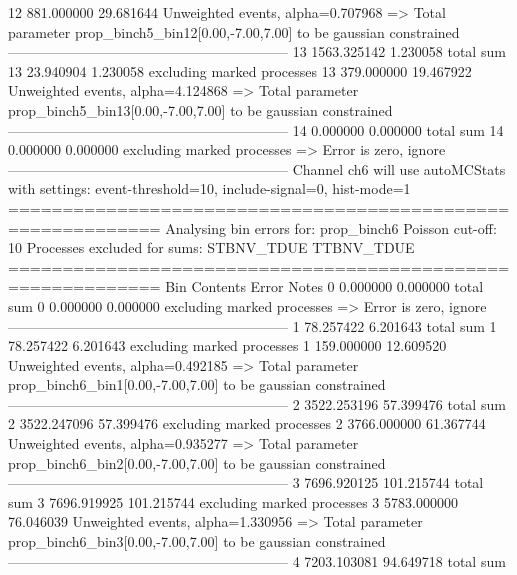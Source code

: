 12         881.000000      29.681644       Unweighted events, alpha=0.707968
  => Total parameter prop_binch5_bin12[0.00,-7.00,7.00] to be gaussian constrained
------------------------------------------------------------
13         1563.325142     1.230058        total sum                     
13         23.940904       1.230058        excluding marked processes    
13         379.000000      19.467922       Unweighted events, alpha=4.124868
  => Total parameter prop_binch5_bin13[0.00,-7.00,7.00] to be gaussian constrained
------------------------------------------------------------
14         0.000000        0.000000        total sum                     
14         0.000000        0.000000        excluding marked processes    
  => Error is zero, ignore      
------------------------------------------------------------
Channel ch6 will use autoMCStats with settings: event-threshold=10, include-signal=0, hist-mode=1
============================================================
Analysing bin errors for: prop_binch6
Poisson cut-off: 10
Processes excluded for sums: STBNV_TDUE TTBNV_TDUE
============================================================
Bin        Contents        Error           Notes                         
0          0.000000        0.000000        total sum                     
0          0.000000        0.000000        excluding marked processes    
  => Error is zero, ignore      
------------------------------------------------------------
1          78.257422       6.201643        total sum                     
1          78.257422       6.201643        excluding marked processes    
1          159.000000      12.609520       Unweighted events, alpha=0.492185
  => Total parameter prop_binch6_bin1[0.00,-7.00,7.00] to be gaussian constrained
------------------------------------------------------------
2          3522.253196     57.399476       total sum                     
2          3522.247096     57.399476       excluding marked processes    
2          3766.000000     61.367744       Unweighted events, alpha=0.935277
  => Total parameter prop_binch6_bin2[0.00,-7.00,7.00] to be gaussian constrained
------------------------------------------------------------
3          7696.920125     101.215744      total sum                     
3          7696.919925     101.215744      excluding marked processes    
3          5783.000000     76.046039       Unweighted events, alpha=1.330956
  => Total parameter prop_binch6_bin3[0.00,-7.00,7.00] to be gaussian constrained
------------------------------------------------------------
4          7203.103081     94.649718       total sum                     
